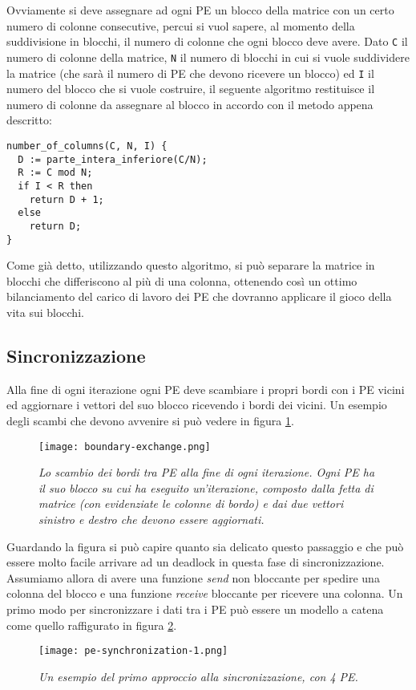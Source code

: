 Ovviamente si deve assegnare ad ogni PE un blocco della matrice con un certo numero di colonne consecutive, percui si vuol sapere, al momento della suddivisione in blocchi, il numero di colonne che ogni blocco deve avere. Dato \texttt{C} il numero di colonne della matrice, \texttt{N} il numero di blocchi in cui si vuole suddividere la matrice (che sar\`a il numero di PE che devono ricevere un blocco) ed \texttt{I} il numero del blocco che si vuole costruire, il seguente algoritmo restituisce il numero di colonne da assegnare al blocco in accordo con il metodo appena descritto:
\begin{verbatim}
number_of_columns(C, N, I) {
  D := parte_intera_inferiore(C/N);
  R := C mod N;
  if I < R then
    return D + 1;
  else
    return D;
}
\end{verbatim}
Come gi\`a detto, utilizzando questo algoritmo, si pu\`o separare la matrice in blocchi che differiscono al pi\`u di una colonna, ottenendo cos\`i un ottimo bilanciamento del carico di lavoro dei PE che dovranno applicare il gioco della vita sui blocchi.

\subsection{Sincronizzazione}
Alla fine di ogni iterazione ogni PE deve scambiare i propri bordi con i PE vicini ed aggiornare i vettori del suo blocco ricevendo i bordi dei vicini. Un esempio degli scambi che devono avvenire si pu\`o vedere in figura \ref{fig:boundary_exchange}.
\begin{figure}[ht]
  \centering
  \texttt{[image: boundary-exchange.png]}
  \caption{\emph{Lo scambio dei bordi tra PE alla fine di ogni iterazione. Ogni PE ha il suo blocco su cui ha eseguito un'iterazione, composto dalla fetta di matrice (con evidenziate le colonne di bordo) e dai due vettori sinistro e destro che devono essere aggiornati.}}
  \label{fig:boundary_exchange}
\end{figure}

Guardando la figura si pu\`o capire quanto sia delicato questo passaggio e che pu\`o essere molto facile arrivare ad un deadlock in questa fase di sincronizzazione. Assumiamo allora di avere una funzione \textit{send} non bloccante per spedire una colonna del blocco e una funzione \textit{receive} bloccante per ricevere una colonna. Un primo modo per sincronizzare i dati tra i PE pu\`o essere un modello a catena come quello raffigurato in figura \ref{fig:pe_synchronization_1}.
\begin{figure}[ht]
  \centering
  \texttt{[image: pe-synchronization-1.png]}
  \caption{\emph{Un esempio del primo approccio alla sincronizzazione, con 4 PE.}}
  \label{fig:pe_synchronization_1}
\end{figure}

